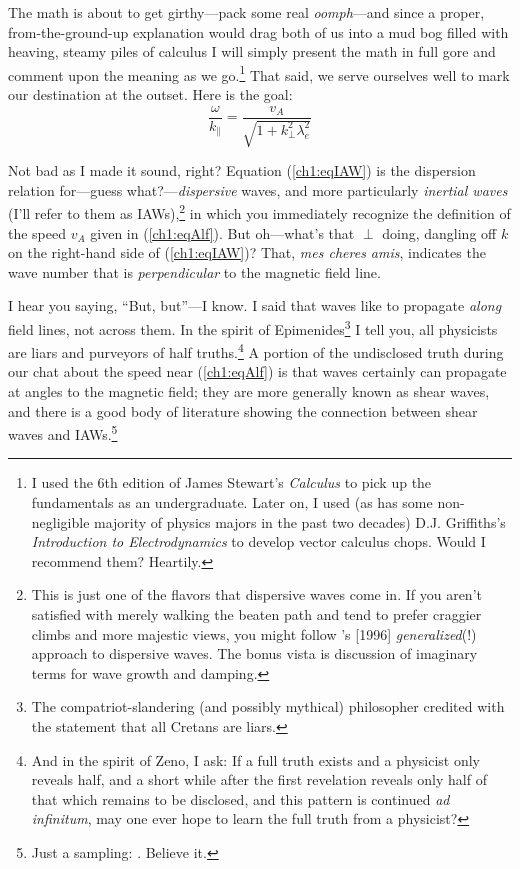 The math is about to get girthy---pack some real \emph{oomph}---and since a
proper, from-the-ground-up explanation would drag both of us into a mud bog
filled with heaving, steamy piles of calculus I will simply present the math in
full gore and comment upon the meaning as we go.\footnote{I used the 6th edition
  of James Stewart's \textsl{Calculus} to pick up the fundamentals as an
  undergraduate. Later on, I used (as has some non-negligible majority of
  physics majors in the past two decades) D.J. Griffiths's \textsl{Introduction
    to Electrodynamics} to develop vector calculus chops. Would I recommend
  them? Heartily.} That said, we serve ourselves well to mark our destination at
the outset. Here is the goal:
\begin{equation}
  \label{ch1:eqIAW}
  \dfrac{\omega}{k_\parallel} = \dfrac{v_A}{ \sqrt{1 + k_\perp^2 \lambda_e^2 }}
\end{equation}

Not bad as I made it sound, right? Equation (\ref{ch1:eqIAW}) is the dispersion
relation for---guess what?---\emph{dispersive} \Alf waves, and more particularly
\emph{inertial \Alf waves} (I'll refer to them as IAWs),\footnote{This is just
  one of the flavors that dispersive \Alf waves come in. If you aren't satisfied
  with merely walking the beaten path and tend to prefer craggier climbs and
  more majestic views, you might follow \citeauthor{Lysak1996}'s [1996]
  \emph{generalized}(!) approach to dispersive \Alf waves. The bonus vista is
  discussion of imaginary terms for wave growth and damping.} in which you
immediately recognize the definition of the \Alf speed $v_A$ given in
(\ref{ch1:eqAlf}).  But oh---what's that $\perp$ doing, dangling off $k$ on the
right-hand side of (\ref{ch1:eqIAW})?  That, \textit{mes cheres amis}, indicates
the wave number that is \emph{perpendicular} to the magnetic field line. 

I hear you saying, ``But, but''---I know. I said that \Alf waves like to
propagate \emph{along} field lines, not across them. In the spirit of
Epimenides\footnote{The compatriot-slandering (and possibly mythical)
  philosopher credited with the statement that all Cretans are liars.} I tell
you, all physicists are liars and purveyors of half truths.\footnote{And in the
  spirit of Zeno, I ask: If a full truth exists and a physicist only reveals
  half, and a short while after the first revelation reveals only half of that
  which remains to be disclosed, and this pattern is continued \textit{ad
    infinitum}, may one ever hope to learn the full truth from a physicist?} A
portion of the undisclosed truth during our chat about the \Alf speed near
(\ref{ch1:eqAlf}) is that \Alf waves certainly can propagate at angles to the
magnetic field; they are more generally known as shear \Alf waves, and there is
a good body of literature showing the connection between shear \Alf waves and
IAWs.\footnote{Just a sampling:
  \citet{Heyvaerts1983,Lysak1996,Rankin1999,Drozdenko2000,Vincena2004,Tsiklauri2005,Chaston2007d,Watt2009}. Believe
  it.}

